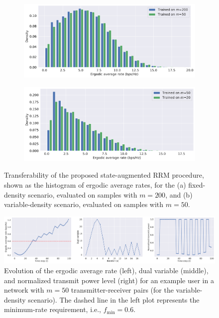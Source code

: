 \documentclass[lettersize,journal]{IEEEtran}
\begin{document}
\begin{figure}[t!]
    \centering
    \begin{subfigure}[t]{0.5\textwidth}
        \centering
        \includegraphics[width=.95\textwidth]{fig_transfer_fixed_density_50To200.pdf}
        \caption{\hspace*{-.25in}}
        \label{fig:transfer_fixed_density_50To200}
    \end{subfigure}%
    \hfill
    \begin{subfigure}[t]{0.5\textwidth}
        \centering
        \includegraphics[width=.95\textwidth]{fig_transfer_variable_density_20To50.pdf}
        \caption{\hspace*{-.25in}}
        \label{fig:transfer_variable_density_20To50}
    \end{subfigure}%
    \caption{Transferability of the proposed state-augmented RRM procedure, shown as the histogram of ergodic average rates, for the (a) fixed-density scenario, evaluated on samples with $m=200$, and (b) variable-density scenario, evaluated on samples with $m=50$.}
    \label{fig:transferability}
\end{figure}

\begin{figure}[h]
\centering
\includegraphics[width=\textwidth]{fig_policy_switching_m50_vardensity.pdf}
\caption{Evolution of the ergodic average rate (left), dual variable (middle), and normalized transmit power level (right) for an example user in a network with $m=50$ transmitter-receiver pairs (for the variable-density scenario). The dashed line in the left plot represents the minimum-rate requirement, i.e., $f_{\min}=0.6$.}
\label{fig:policy_switching_m50_vardensity}
\end{figure}
\end{document}
